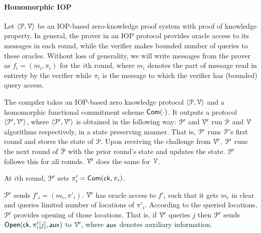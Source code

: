 \paragraph*{Homomorphic IOP} Let $\langle \mathcal{P},\mathcal{V}\rangle$ be an IOP-based zero-knowledge proof system with proof of knowledge property. In general, the prover in an IOP protocol provides oracle access to its messages in each round, while the verifier makes bounded number of queries to these oracles. Without loss of generality, we will write messages from the prover as $f_i = (m_i, \pi_i)$ for the $i$th round, where $m_i$ denotes the part of message read in entirety by the verifier while $\pi_i$ is the message to which the verifier has (bounded) query access.

The compiler takes an IOP-based zero knowledge protocol $\langle \mathcal{P},\mathcal{V}\rangle$ and a homomorphic functional commitment scheme $\mathsf{Com}(\cdot)$. It outputs a protocol $\langle \mathcal{P}',\mathcal{V}'\rangle$, where $\langle \mathcal{P}',\mathcal{V}'\rangle$ is obtained in the following way: $\mathcal{P}'$ and $\mathcal{V}'$ run $\mathcal{P}$ and $\mathcal{V}$ algorithms respectively, in a state preserving manner. That is, $\mathcal{P}'$ runs $\mathcal{P}$'s first round and stores the state of $\mathcal{P}$. Upon receiving the challenge from $\mathcal{V}'$, $\mathcal{P}'$ runs the next round of $\mathcal{P}$ with the prior round's state and updates the state. $\mathcal{P}'$ follows this for all rounds. $\mathcal{V}'$ does the same for $\mathcal{V}$. 
 
At $i$th round, $\mathcal{P}'$ sets $\pi'_i = \mathsf{Com}(\mathsf{ck},\pi_i)$.

$\mathcal{P}'$ sends $f'_i = (m_i, \pi'_i)$. $\mathcal{V}'$ has oracle access to $f'_i$ such that it gets $m_i$ in clear and queries limited number of locations of $\pi'_i$. According to the queried locations, $\mathcal{P}'$ provides opening of those locations. That is, if $\mathcal{V}'$ queries $j$ then $\mathcal{P}'$ sends $\mathsf{Open}(\mathsf{ck}, \pi'_i[j], \mathsf{aux})$ to $\mathcal{V}'$, where $\mathsf{aux}$ denotes auxiliary information.

